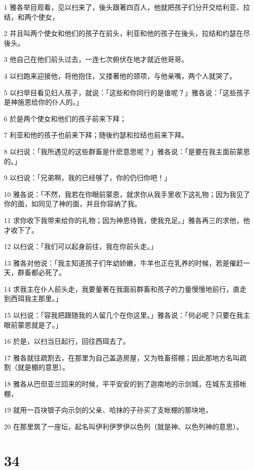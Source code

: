 \par 1 雅各举目观看，见以扫来了，後头跟著四百人，他就把孩子们分开交给利亚、拉结，和两个使女，
\par 2 并且叫两个使女和他们的孩子在前头，利亚和他的孩子在後头，拉结和约瑟在尽後头。
\par 3 他自己在他们前头过去，一连七次俯伏在地才就近他哥哥。
\par 4 以扫跑来迎接他，将他抱住，又搂著他的颈项，与他亲嘴，两个人就哭了。
\par 5 以扫举目看见妇人孩子，就说：「这些和你同行的是谁呢？」雅各说：「这些孩子是神施恩给你的仆人的。」
\par 6 於是两个使女和他们的孩子前来下拜；
\par 7 利亚和他的孩子也前来下拜；随後约瑟和拉结也前来下拜。
\par 8 以扫说：「我所遇见的这些群畜是什麽意思呢？」雅各说：「是要在我主面前蒙恩的。」
\par 9 以扫说：「兄弟啊，我的已经够了，你的仍归你吧！」
\par 10 雅各说：「不然，我若在你眼前蒙恩，就求你从我手里收下这礼物；因为我见了你的面，如同见了神的面，并且你容纳了我。
\par 11 求你收下我带来给你的礼物；因为神恩待我，使我充足。」雅各再三的求他，他才收下了。
\par 12 以扫说：「我们可以起身前往，我在你前头走。」
\par 13 雅各对他说：「我主知道孩子们年幼娇嫩，牛羊也正在乳养的时候，若是催赶一天，群畜都必死了。
\par 14 求我主在仆人前头走，我要量著在我面前群畜和孩子的力量慢慢地前行，直走到西珥我主那里。」
\par 15 以扫说：「容我把跟随我的人留几个在你这里。」雅各说：「何必呢？只要在我主眼前蒙恩就是了。」
\par 16 於是，以扫当日起行，回往西珥去了。
\par 17 雅各就往疏割去，在那里为自己盖造房屋，又为牲畜搭棚；因此那地方名叫疏割（就是棚的意思）。
\par 18 雅各从巴但亚兰回来的时候，平平安安的到了迦南地的示剑城，在城东支搭帐棚，
\par 19 就用一百块银子向示剑的父亲、哈抹的子孙买了支帐棚的那块地，
\par 20 在那里筑了一座坛，起名叫伊利伊罗伊以色列（就是神、以色列神的意思）。

\chapter{34}

